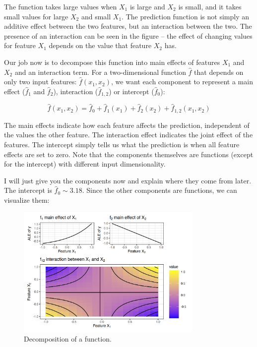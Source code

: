 \documentclass[
  10pt,
]{scrbook}
\begin{document}
The function takes large values when \(X_1\) is large and \(X_2\) is small, and it takes small values for large \(X_2\) and small \(X_1\).
The prediction function is not simply an additive effect between the two features, but an interaction between the two.
The presence of an interaction can be seen in the figure -- the effect of changing values for feature \(X_1\) depends on the value that feature \(X_2\) has.

Our job now is to decompose this function into main effects of features \(X_1\) and \(X_2\) and an interaction term.
For a two-dimensional function \(\hat{f}\) that depends on only two input features: \(\hat{f}(x_1, x_2)\), we want each component to represent a main effect (\(\hat{f}_1\) and \(\hat{f}_2\)), interaction (\(\hat{f}_{1,2}\)) or intercept (\(\hat{f}_0\)):

\[\hat{f}(x_1, x_2) = \hat{f}_0 + \hat{f}_1(x_1) + \hat{f}_2(x_2) + \hat{f}_{1,2}(x_{1},x_{2})\]

The main effects indicate how each feature affects the prediction, independent of the values the other feature.
The interaction effect indicates the joint effect of the features.
The intercept simply tells us what the prediction is when all feature effects are set to zero.
Note that the components themselves are functions (except for the intercept) with different input dimensionality.

I will just give you the components now and explain where they come from later.
The intercept is \(\hat{f}_0\sim3.18\).
Since the other components are functions, we can visualize them:

\begin{figure}

{\centering \includegraphics[width=0.8\textwidth]{images/unnamed-chunk-17-1} 

}

\caption{Decomposition of a function.}\label{fig:unnamed-chunk-17}
\end{figure}
\end{document}
